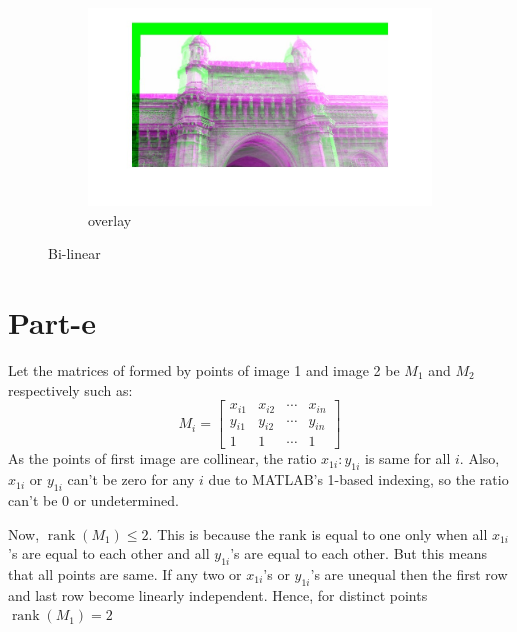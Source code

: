 \documentclass[a4paper]{article}
\begin{document}
\begin{figure}[H]
\begin{subfigure}{.4\textwidth}
\end{subfigure}
\begin{subfigure}{.4\textwidth}
  \centering
  \includegraphics[width=.8\linewidth]{ob.jpg}  
  \caption{overlay}
  
\end{subfigure}
\caption{Bi-linear}

\end{figure}
\section{Part-e} %
\label{sec:part_e}

Let the matrices of formed by points of image 1 and image 2 be $M_1$ and $M_2$ respectively such as:
\begin{equation}
	M_i =
	\begin{bmatrix}
		x_{i1} & x_{i2} & \cdots & x_{in}\\
		y_{i1} & y_{i2} & \cdots & y_{in}\\
		1 & 1 & \cdots & 1
	\end{bmatrix}
\end{equation}
As the points of first image are collinear, the ratio $x_{1i}:y_{1i}$ is same for all $i$. Also, $x_{1i}$ or $y_{1i}$ can't be zero for any $i$ due to MATLAB's 1-based indexing, so the ratio can't be 0 or undetermined.

Now, $\operatorname{rank}(M_1)\leq 2$. This is because the rank is equal to one only when all $x_{1i}$'s are equal to each other and all $y_{1i}$'s are equal to each other. But this means that all points are same. If any two or $x_{1i}$'s or $y_{1i}$'s are unequal then the first row and last row become linearly independent. Hence, for distinct points $\operatorname{rank}(M_1)=2$ 
\end{document}
